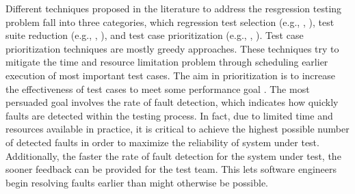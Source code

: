 \documentclass{sig-alternate}
\begin{document}
Different techniques proposed in the literature to address the resgression testing problem fall into three categories, which regression test selection (e.g., \cite{harrold:empirical}, \cite{rothermel:analyzing}), test suite reduction (e.g., \cite{jones:reduction}, \cite{offutt:procedures}), and test case prioritization (e.g., \cite{elbaum:family}, \cite{rothermel:prioritizing}). Test case prioritization techniques are mostly greedy approaches. These techniques try to mitigate the time and resource limitation problem through scheduling earlier execution of most important test cases. The aim in prioritization is to increase the effectiveness of test cases to meet some performance goal \cite{rothermel:prioritizing}. The most persuaded goal involves the rate of fault detection, which indicates how quickly faults are detected within the testing process.
In fact, due to limited time and resources available in practice, it is critical to achieve the highest possible number of detected faults in order to maximize the reliability of system under test. Additionally, the faster the rate of fault detection for the system under test, the sooner feedback can be provided for the test team. This lets software engineers begin resolving faults earlier than might otherwise be possible. 
\end{document}
